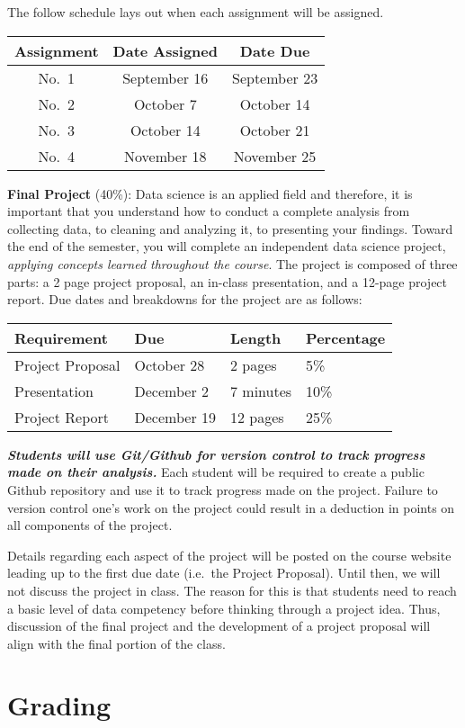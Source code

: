 \documentclass[
  12pt,
]{article}
\begin{document}
The follow schedule lays out when each assignment will be assigned.

\begin{longtable}[]{@{}ccc@{}}
\toprule
Assignment & Date Assigned & Date Due\tabularnewline
\midrule
\endhead
No.~1 & September 16 & September 23\tabularnewline
No.~2 & October 7 & October 14\tabularnewline
No.~3 & October 14 & October 21\tabularnewline
No.~4 & November 18 & November 25\tabularnewline
\bottomrule
\end{longtable}

\textbf{Final Project} (40\%): Data science is an applied field and
therefore, it is important that you understand how to conduct a complete
analysis from collecting data, to cleaning and analyzing it, to
presenting your findings. Toward the end of the semester, you will
complete an independent data science project, \emph{applying concepts
learned throughout the course}. The project is composed of three parts:
a 2 page project proposal, an in-class presentation, and a 12-page
project report. Due dates and breakdowns for the project are as follows:

\begin{longtable}[]{@{}llll@{}}
\toprule
\textbf{Requirement} & \textbf{Due} & \textbf{Length} &
\textbf{Percentage}\tabularnewline
\midrule
\endhead
Project Proposal & October 28 & 2 pages & 5\%\tabularnewline
Presentation & December 2 & 7 minutes & 10\%\tabularnewline
Project Report & December 19 & 12 pages & 25\%\tabularnewline
\bottomrule
\end{longtable}

\textbf{\emph{Students will use Git/Github for version control to track
progress made on their analysis.}} Each student will be required to
create a public Github repository and use it to track progress made on
the project. Failure to version control one's work on the project could
result in a deduction in points on all components of the project.

Details regarding each aspect of the project will be posted on the
course website leading up to the first due date (i.e.~the Project
Proposal). Until then, we will not discuss the project in class. The
reason for this is that students need to reach a basic level of data
competency before thinking through a project idea. Thus, discussion of
the final project and the development of a project proposal will align
with the final portion of the class.

\hypertarget{grading}{%
\section{Grading}\label{grading}}
\end{document}
